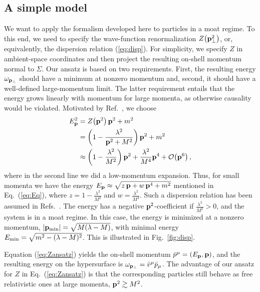 \documentclass[reprint,superscriptaddress,english,preprintnumbers,amsmath,amssymb,aps,prx]{revtex4-2}
\def\eq#1{(\ref{#1})}
\def\Eq#1{Eq.~(\ref{#1})}
\def\Fig#1{Fig.~\ref{#1}}
\begin{document}
\subsection{A simple model}\label{sec:BW}

We want to apply the formalism developed here to particles in a moat regime. To this end, we need to specify the wave-function renormalization $Z\big(\bold{p}_\perp^2\big)$, or, equivalently, the dispersion relation \eq{eq:disp}. For simplicity, we specify $Z$ in ambient-space coordinates and then project the resulting on-shell momentum normal to $\Sigma$.
Our ansatz is based on two requirements. First, the resulting energy $\omega_{\bold{p}_\perp}$ should have a minimum at nonzero momentum and, second, it should have a well-defined large-momentum limit. The latter requirement entails that the energy grows linearly with momentum for large momenta, as otherwise causality would be violated. Motivated by Ref.\ \cite{Schindler:2019ugo}, we choose
\begin{align}\label{eq:Zansatz}
\begin{split}
E_{\bold{p}}^2&=  Z\big(\bold{p}^2\big)\,\bold{p}^2+m^2\\
&= \bigg(1 - \frac{\lambda^2}{\bold{p}^2+M^2}\bigg)\,\bold{p}^2+m^2\\
&\approx \bigg(1 - \frac{\lambda^2}{M^2}\bigg)\,\bold{p}^2 +\frac{\lambda^2}{M^4}\bold{p}^4 + \mathcal{O}\big(\bold{p}^6\big)\,,
\end{split}
\end{align}
where in the second line we did a low-momentum expansion. Thus, for small momenta we have the energy $E_{\bold{p}} \approx \sqrt{z\, \bold{p} + w\, \bold{p}^4 + m^2}$ mentioned in \Eq{eq:Eq}, where $z= 1-\frac{\lambda^2}{M^2}$ and $w = \frac{\lambda^2}{M^4}$. Such a dispersion relation has been assumed in Refs.\ \cite{Pisarski:2020dnx,Pisarski:2021qof}.
The energy has a negative $\bold{p}^2$-coefficient if $\frac{\lambda^2}{M^2} >0$, and the system is in a moat regime. 
In this case, the energy is minimized at a nonzero momentum, $|\bold{p}_{\rm min}| = \sqrt{M(\lambda-M)}$, with minimal energy $E_{\rm min} = \sqrt{m^2-(\lambda-M)^2}$. This is illustrated in \Fig{fig:disp}.

Equation (\ref{eq:Zansatz}) yields the on-shell momentum $\bar p^\mu = (E_\bold{p},\bold{p})$, and the resulting energy on the hypersurface is 
$\omega_{\bold{p}_\perp} = \hat v^\mu \bar p_\mu$. The advantage of our ansatz for $Z$ in \Eq{eq:Zansatz} is that the corresponding particles still behave as free relativistic ones at large momenta, $\bold{p}^2 \gtrsim M^2$.
\end{document}
